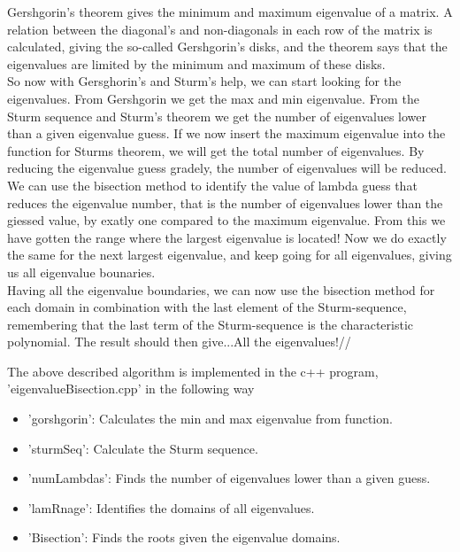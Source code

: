 \documentclass{article}
\begin{document}
Gershgorin's theorem gives the minimum and maximum eigenvalue of a matrix. A relation between the diagonal's and non-diagonals in each row of the matrix is calculated, giving the so-called Gershgorin's disks, and the theorem says that the eigenvalues are limited by the minimum and maximum of these disks.\\

So now with Gersghorin's and Sturm's help, we can start looking for the eigenvalues. From Gershgorin we get the max and min eigenvalue. From the Sturm sequence and Sturm's theorem we get the number of eigenvalues lower than a given eigenvalue guess. If we now insert the maximum eigenvalue into the function for Sturms theorem, we will get the total number of eigenvalues. By reducing the eigenvalue guess gradely, the number of eigenvalues will be reduced. We can use the bisection method to identify the value of lambda guess that reduces the eigenvalue number, that is the number of eigenvalues lower than the giessed value, by exatly one compared to the maximum eigenvalue. From this we have gotten the range where the largest eigenvalue is located! Now we do exactly the same for the next largest eigenvalue, and keep going for all eigenvalues, giving us all eigenvalue bounaries. \\

Having all the eigenvalue boundaries, we can now use the bisection method for each domain in combination with the last element of the Sturm-sequence, remembering that the last term of the Sturm-sequence is the characteristic polynomial. The result should then give...All the eigenvalues!//

The above described algorithm is implemented in the c++ program, 'eigenvalueBisection.cpp' in the following way

\begin{itemize}
	\item  'gorshgorin': Calculates the min and max eigenvalue from function.
	
	\item 'sturmSeq': Calculate the Sturm sequence.
	
	\item 'numLambdas': Finds the number of eigenvalues lower than a given guess.
	
	\item 'lamRnage': Identifies the domains of all eigenvalues.
	
	\item 'Bisection': Finds the roots given the eigenvalue domains.
	
\end{itemize}
\end{document}
